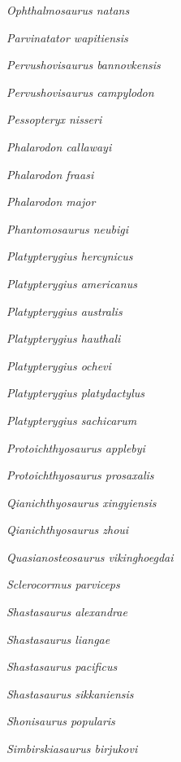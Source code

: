 \emph{Ophthalmosaurus natans}~

\emph{Parvinatator wapitiensis}~

\emph{Pervushovisaurus bannovkensis}~

\emph{Pervushovisaurus campylodon}~

\emph{Pessopteryx nisseri}~

\emph{Phalarodon callawayi}~

\emph{Phalarodon fraasi}~

\emph{Phalarodon major}~

\emph{Phantomosaurus neubigi}~

\emph{Platypterygius  hercynicus}~

\emph{Platypterygius americanus}~

\emph{Platypterygius australis}~

\emph{Platypterygius hauthali}~

\emph{Platypterygius ochevi}~

\emph{Platypterygius platydactylus}~

\emph{Platypterygius sachicarum}~

\emph{Protoichthyosaurus applebyi}~

\emph{Protoichthyosaurus prosaxalis}~

\emph{Qianichthyosaurus xingyiensis}~

\emph{Qianichthyosaurus zhoui}~

\emph{Quasianosteosaurus vikinghoegdai}~

\emph{Sclerocormus parviceps}~

\emph{Shastasaurus alexandrae}~

\emph{Shastasaurus liangae}~

\emph{Shastasaurus pacificus}~

\emph{Shastasaurus sikkaniensis}~

\emph{Shonisaurus popularis}~

\emph{Simbirskiasaurus birjukovi}~

